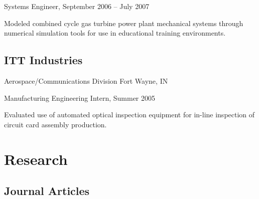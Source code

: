 \documentclass[10pt,letterpaper]{article}
\renewenvironment{itemize}{
  \begin{list}{}{
    \setlength{\leftmargin}{30pt}
    \setlength{\itemsep}{0.2em}
    \setlength{\parskip}{0pt}
    \setlength{\parsep}{0.25em}
  }
}{
  \end{list}
}
\begin{document}
\begin{itemize}
\item Systems Engineer, September 2006 -- July 2007
    \begin{itemize}
    \item Modeled combined cycle gas turbine power plant mechanical systems
      through numerical simulation tools for use in educational training
      environments.
    \end{itemize}
\end{itemize}

\subsection*{ITT Industries}
Aerospace/Communications Division \hfill Fort Wayne, IN

\begin{itemize}
\item Manufacturing Engineering Intern, Summer 2005
    \begin{itemize}
    \item Evaluated use of automated optical inspection equipment for in-line inspection of circuit card assembly production.
    \end{itemize}
\end{itemize}

\section*{Research}

\titleformat{\subsection}[hang]{\large \it}{}{0pt}{}[]


\newenvironment{biblist}{%
  \begin{list}{}{%
    \setlength{\leftmargin}{50pt}
    \setlength{\itemsep}{0.2em}
    \setlength{\parskip}{0pt}
    \setlength{\parsep}{0.25em}
    \setlength{\itemindent}{-20pt}%
  }
}{\end{list}}

\subsection*{Journal Articles}

\begin{biblist}
\item {}
\end{biblist}
\end{document}
